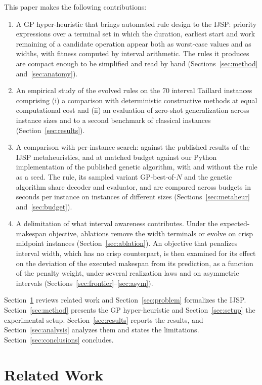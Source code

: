 \documentclass[preprint,number,sort&compress,12pt]{elsarticle}
\begin{document}
This paper makes the following contributions:
\begin{enumerate}
\item A GP hyper-heuristic that brings automated rule design to the
  IJSP: priority expressions over a terminal set in which the duration,
  earliest start and work remaining of a candidate operation appear
  both as worst-case values and as widths, with fitness computed by
  interval arithmetic. The rules it produces are compact enough to be
  simplified and read by hand (Sections~\ref{sec:method}
  and~\ref{sec:anatomy}).
\item An empirical study of the evolved rules on the 70 interval
  Taillard instances comprising (i) a comparison with deterministic
  constructive methods at equal computational cost and (ii) an
  evaluation of zero-shot generalization across instance sizes and to
  a second benchmark of classical instances
  (Section~\ref{sec:results}).
\item A comparison with per-instance search: against the published
  results of the IJSP metaheuristics, and at matched budget against our
  Python implementation of the published genetic algorithm, with and
  without the rule as a seed. The rule, its sampled variant
  GP-best-of-$N$ and the genetic algorithm share decoder and evaluator,
  and are compared across budgets in seconds per instance on instances
  of different sizes (Sections~\ref{sec:metaheur} and~\ref{sec:budget}).
\item A delimitation of what interval awareness contributes. Under the
  expected-makespan objective, ablations remove the width terminals or
  evolve on crisp midpoint instances (Section~\ref{sec:ablation}). An
  objective that penalizes interval width, which has no crisp
  counterpart, is then examined for its effect on the deviation of the
  executed makespan from its prediction, as a function of the penalty
  weight, under several realization laws and on asymmetric intervals
  (Sections~\ref{sec:frontier}--\ref{sec:asym}).
\end{enumerate}

Section~\ref{sec:related} reviews related work and
Section~\ref{sec:problem} formalizes the IJSP. Section~\ref{sec:method}
presents the GP hyper-heuristic and Section~\ref{sec:setup} the
experimental setup. Section~\ref{sec:results} reports the results, and
Section~\ref{sec:analysis} analyzes them and states the limitations.
Section~\ref{sec:conclusions} concludes.

\section{Related Work}
\label{sec:related}
\end{document}
